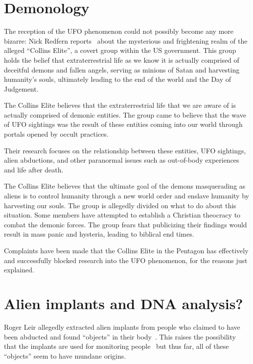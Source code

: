 \section{Demonology}
\label{2023-UFO-part-Perception-abductions-dem}

The reception of the UFO phenomenon could not possibly become any more bizarre:
Nick Redfern reports~\cite{Redfern2010Aug,Heiser2010Nov} about the mysterious and frightening realm of the alleged ``Collins Elite'',
a covert group within the US government. This group holds the belief that extraterrestrial life as we know it is actually comprised of deceitful demons and fallen angels, serving as minions of Satan and harvesting humanity's souls,
ultimately leading to the end of the world and the Day of Judgement.

The Collins Elite believes that the extraterrestrial life that we are aware of is actually comprised of demonic entities.
The group  came to believe that the wave of UFO sightings was the result of these entities coming into our world through portals
opened by occult practices.

Their research focuses on the relationship between these entities, UFO sightings,
alien abductions, and other paranormal issues such as out-of-body experiences and life after death.

The Collins Elite believes that the ultimate goal of the demons masquerading as aliens
is to control humanity through a new world order and enslave humanity by harvesting our souls.
The group is allegedly divided on what to do about this situation.
Some members have attempted to establish a Christian theocracy to combat the demonic forces.
The group fears that publicizing their findings would result in mass panic and hysteria,
leading to biblical end times.


Complaints have been made that the Collins Elite in the Pentagon has effectively and successfully blocked research into
the UFO phenomenon, for the reasons just explained.

\section{Alien implants and DNA analysis?}
\label{2023-UFO-part-Perception-abductions-alim}

Roger Leir allegedly extracted alien implants from people who claimed to have been abducted and
found ``objects'' in their body~\cite{Leir2000}.
This raises the possibility that the implants are used for monitoring people~\cite{DolanDisclosure2018Sep} but
thus far, all of these ``objects'' seem to have mundane origins.

